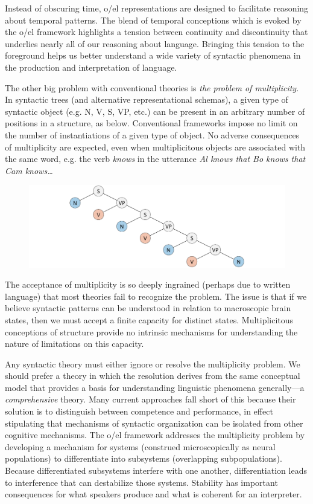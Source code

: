   Instead of obscuring time, o/el representations are designed to facilitate reasoning about temporal patterns. The blend of temporal conceptions which is evoked by the o/el framework highlights a tension between continuity and discontinuity that underlies nearly all of our reasoning about language. Bringing this tension to the foreground helps us better understand a wide variety of syntactic phenomena in the production and interpretation of language.

The other big problem with conventional theories is \textit{the problem of multiplicity}. In syntactic trees (and alternative representational schemas), a given type of syntactic object (e.g. N, V, S, VP, etc.) can be present in an arbitrary number of positions in a structure, as below. Conventional frameworks impose no limit on the number of instantiations of a given type of object. No adverse consequences of multiplicity are expected, even when multiplicitous objects are associated with the same word, e.g. the verb \textit{knows} in the utterance \textit{Al knows that Bo knows that Cam knows…}  

  
\begin{figure}
\includegraphics[width=\textwidth]{figures/Tilsen-img7.png}
\caption{\missingcaption}
\label{fig:}
\end{figure}
 

  The acceptance of multiplicity is so deeply ingrained (perhaps due to written language) that most theories fail to recognize the problem. The issue is that if we believe syntactic patterns can be understood in relation to macroscopic brain states, then we must accept a finite capacity for distinct states. Multiplicitous conceptions of structure provide no intrinsic mechanisms for understanding the nature of limitations on this capacity.

  Any syntactic theory must either ignore or resolve the multiplicity problem. We should prefer a theory in which the resolution derives from the same conceptual model that provides a basis for understanding linguistic phenomena generally—a \textit{comprehensive} theory. Many current approaches fall short of this because their solution is to distinguish between competence and performance, in effect stipulating that mechanisms of syntactic organization can be isolated from other cognitive mechanisms. The o/el framework addresses the multiplicity problem by developing a mechanism for systems (construed microscopically as neural populations) to differentiate into subsystems (overlapping subpopulations). Because differentiated subsystems interfere with one another, differentiation leads to interference that can destabilize those systems. Stability has important consequences for what speakers produce and what is coherent for an interpreter.


